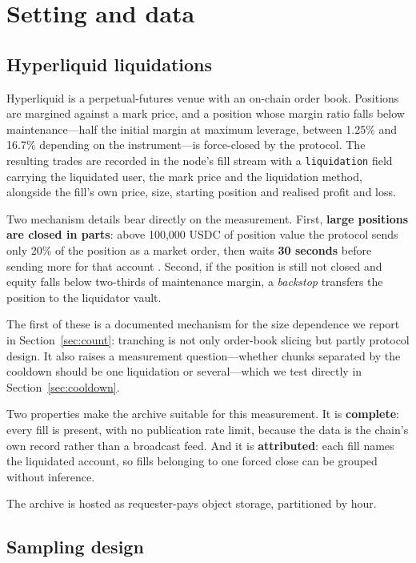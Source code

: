 \documentclass[11pt,a4paper]{article}
\begin{document}
\section{Setting and data}
\label{sec:data}

\subsection{Hyperliquid liquidations}

Hyperliquid is a perpetual-futures venue with an on-chain order book. Positions are margined
against a mark price, and a position whose margin ratio falls below maintenance---half the
initial margin at maximum leverage, between 1.25\% and 16.7\% depending on the
instrument---is force-closed by the protocol. The resulting trades are recorded in the node's
fill stream with a \texttt{liquidation} field carrying the liquidated user, the mark price and
the liquidation method, alongside the fill's own price, size, starting position and realised
profit and loss.

Two mechanism details bear directly on the measurement. First, \textbf{large positions are closed
in parts}: above 100{,}000 USDC of position value the protocol sends only 20\% of the position as
a market order, then waits \textbf{30 seconds} before sending more for that account
\cite{hyperliquid}. Second, if the position is still not closed and equity falls below two-thirds
of maintenance margin, a \emph{backstop} transfers the position to the liquidator vault.

The first of these is a documented mechanism for the size dependence we report in
Section~\ref{sec:count}: tranching is not only order-book slicing but partly protocol design. It
also raises a measurement question---whether chunks separated by the cooldown should be one
liquidation or several---which we test directly in Section~\ref{sec:cooldown}.

Two properties make the archive suitable for this measurement. It is \textbf{complete}: every
fill is present, with no publication rate limit, because the data is the chain's own record
rather than a broadcast feed. And it is \textbf{attributed}: each fill names the liquidated
account, so fills belonging to one forced close can be grouped without inference.

The archive is hosted as requester-pays object storage, partitioned by hour.

\subsection{Sampling design}
\end{document}
